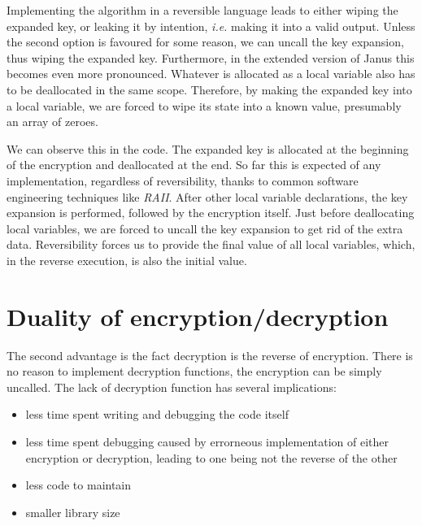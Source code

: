 \documentclass[a4paper,10pt,openright]{memoir}
\newcommand{\ie}{\emph{i.e.}\xspace}
\newcommand{\term}[1]{\textit{#1}}
\begin{document}
Implementing the algorithm in a reversible language leads to either 
wiping the expanded key, or leaking it by intention, \ie making it into 
a valid output. Unless the second option is favoured for some reason, 
we can uncall the key expansion, thus wiping the expanded key. 
Furthermore, in the extended version of Janus this becomes even more 
pronounced. Whatever is allocated as a local variable also has to be 
deallocated in the same scope. Therefore, by making the expanded key 
into a local variable, we are forced to wipe its state into a known 
value, presumably an array of zeroes.

We can observe this in the code. The expanded key is allocated at the 
beginning of the encryption and deallocated at the end. So far this is 
expected of any implementation, regardless of reversibility, thanks to 
common software engineering techniques like \term{RAII}. After other 
local variable declarations, the key expansion is performed, followed 
by the encryption itself. Just before deallocating local variables, we 
are forced to uncall the key expansion to get rid of the extra data. 
Reversibility forces us to provide the final value of all local 
variables, which, in the reverse execution, is also the initial value.

\section{Duality of encryption/decryption}

The second advantage is the fact decryption is the reverse of 
encryption. There is no reason to implement decryption functions, the 
encryption can be simply uncalled. The lack of decryption function has 
several implications:

\begin{itemize}

\item less time spent writing and debugging the code itself

\item less time spent debugging caused by errorneous implementation of 
either encryption or decryption, leading to one being not the reverse 
of the other

\item less code to maintain

\item smaller library size

\end{itemize}
\end{document}
